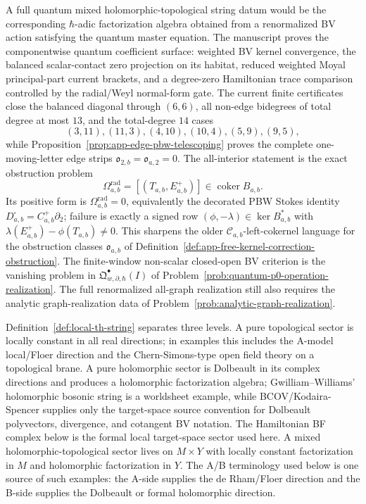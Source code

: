 \documentclass[11pt]{memoir}
\begin{document}
\begin{rmk}
  A full quantum mixed holomorphic-topological string datum would be the
  corresponding $\hbar$-adic factorization algebra obtained from a
  renormalized BV action satisfying the quantum master equation. The
  manuscript proves the componentwise quantum coefficient surface:
  weighted BV kernel convergence, the balanced scalar-contact zero
  projection on its habitat, reduced weighted Moyal principal-part
  current brackets, and a degree-zero Hamiltonian trace comparison
  controlled by the radial/Weyl normal-form gate.  The current finite
  certificates close the balanced diagonal through \((6,6)\), all
  non-edge bidegrees of total degree at most \(13\), and the
  total-degree \(14\) cases
  \[
    (3,11),(11,3),(4,10),(10,4),(5,9),(9,5),
  \]
  while
  Proposition~\ref{prop:app-edge-pbw-telescoping} proves the complete
  one-moving-letter edge strips
  \(\mathfrak o_{2,b}=\mathfrak o_{a,2}=0\).  The all-interior
  statement is the exact obstruction problem
  \[
    \Omega^{\mathrm{rad}}_{a,b}
    =
    [(T_{a,b},E^+_{a,b})]\in\operatorname{coker}B_{a,b}.
  \]
  Its positive form is
  \(\Omega^{\mathrm{rad}}_{a,b}=0\), equivalently the decorated PBW
  Stokes identity \(D^\square_{a,b}=C^+_{a,b}\partial_2\); failure is
  exactly a signed row \((\phi,-\lambda)\in\ker B_{a,b}^*\) with
  \(\lambda(E^+_{a,b})-\phi(T_{a,b})\ne0\).  This sharpens the older
  \(\mathcal C_{a,b}\)-left-cokernel language for the obstruction
  classes \(\mathfrak o_{a,b}\) of
  Definition~\ref{def:app-free-kernel-correction-obstruction}.  The
  finite-window
  non-scalar closed-open BV criterion is the vanishing problem in
  \(\mathfrak Q^\bullet_{w,\partial,\hbar}(I)\) of
  Problem~\ref{prob:quantum-p0-operation-realization}.  The full
  renormalized all-graph realization still also requires the analytic
  graph-realization data of
  Problem~\ref{prob:analytic-graph-realization}.
\end{rmk}

Definition~\ref{def:local-th-string} separates three levels. A pure
topological sector is locally constant in all real directions; in examples
this includes the A-model local/Floer direction and the Chern-Simons-type
open field theory on a topological brane. A pure holomorphic sector is
Dolbeault in its complex directions and produces a holomorphic
factorization algebra; Gwilliam--Williams' holomorphic bosonic string is a
worldsheet example, while BCOV/Kodaira-Spencer supplies only the
target-space source convention for Dolbeault polyvectors, divergence, and
cotangent BV notation. The Hamiltonian BF complex below is the formal
local target-space sector used here. A mixed
holomorphic-topological sector lives on $M\times Y$ with locally constant
factorization in $M$ and holomorphic factorization in $Y$. The A/B
terminology used below is one source of such examples: the A-side supplies
the de Rham/Floer direction and the B-side supplies the Dolbeault or formal
holomorphic direction.
\end{document}
